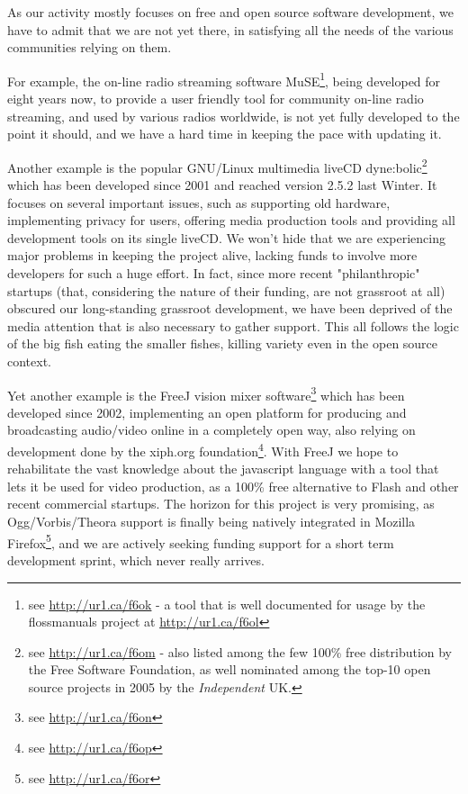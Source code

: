 As our activity mostly focuses on free and open source software development, we
have to admit that we are not yet there, in satisfying all the needs of the
various communities relying on them.

For example, the on-line radio streaming software MuSE\footnote{see
\url{http://ur1.ca/f6ok} - a tool that is well documented for usage by the
f\hbox{}lossmanuals project at \url{http://ur1.ca/f6ol}}, being developed for
eight years now, to provide a user friendly tool for community on-line radio
streaming, and used by various radios worldwide, is not yet fully developed to
the point it should, and we have a hard time in keeping the pace with updating
it.

Another example is the popular GNU/Linux multimedia liveCD
dyne:bolic\footnote{see \url{http://ur1.ca/f6om} - also listed among the few
100\% free distribution by the Free Software Foundation, as well nominated among
the top-10 open source projects in 2005 by the \textit{Independent} UK.} which
has been developed since 2001 and reached version 2.5.2 last Winter. It focuses
on several important issues, such as supporting old hardware, implementing
privacy for users, of\hbox{}fering media production tools and providing all
development tools on its single liveCD. We won't hide that we are experiencing
major problems in keeping the project alive, lacking funds to involve more
developers for such a huge ef\hbox{}fort. In fact, since more recent
"philanthropic" startups (that, considering the nature of their funding, are not
grassroot at all) obscured our long-standing grassroot development, we have been
deprived of the media attention that is also necessary to gather support. This
all follows the logic of the big f\hbox{}ish eating the smaller f\hbox{}ishes,
killing variety even in the open source context.

Yet another example is the FreeJ vision mixer software\footnote{see
\url{http://ur1.ca/f6on}} which has been developed since 2002, implementing an
open platform for producing and broadcasting audio/video online in a completely
open way, also relying on development done by the xiph.org
foundation\footnote{see \url{http://ur1.ca/f6op}}. With FreeJ we hope to
rehabilitate the vast knowledge about the javascript language with a tool that
lets it be used for video production, as a 100\% free alternative to
F\hbox{}lash and other recent commercial startups. The horizon for this project
is very promising, as Ogg/Vorbis/Theora support is f\hbox{}inally being natively
integrated in Mozilla F\hbox{}irefox\footnote{see \url{http://ur1.ca/f6or}}, and
we are actively seeking funding support for a short term development sprint,
which never really arrives.

